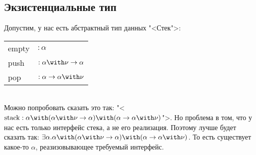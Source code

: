 \subsection{\texorpdfstring{Экзистенциальные тип}{Existential types}}

Допустим, у нас есть абстрактный тип данных "<Стек">: \\
\begin{tabular}{l l}
    empty & $: \alpha$ \\
    push  & $: \alpha\with\nu\rightarrow\alpha$ \\
    pop   & $: \alpha\rightarrow\alpha\with\nu$ \\
\end{tabular} \\
Можно попробовать сказать это так: "<$\mathrm{stack} :
    \alpha \with (\alpha\with\nu\rightarrow\alpha) \with (\alpha\rightarrow\alpha\with\nu)$">.
Но проблема в том, что у нас есть только интерфейс стека, а не его реализация. Поэтому лучше будет сказать так:
    $\exists \alpha . \alpha \with (\alpha\with\nu\rightarrow\alpha) \with (\alpha\rightarrow\alpha\with\nu)$.
То есть существует какое-то $\alpha$, реазизовывающее требуемый интерфейс.

